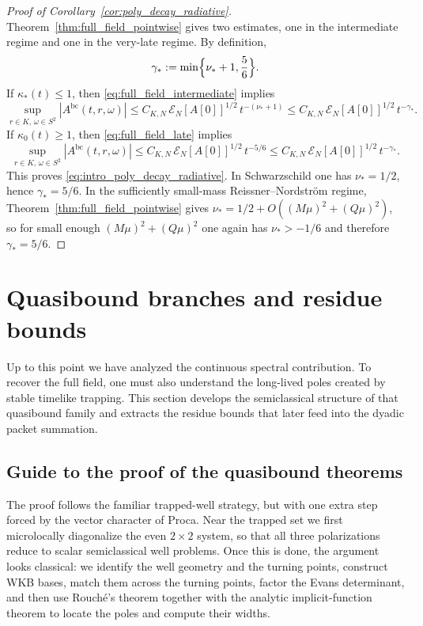 \documentclass[12pt]{article}
\numberwithin{equation}{section}
\theoremstyle{plain}
\theoremstyle{definition}
\theoremstyle{remark}
\newcommand{\bc}{\mathrm{bc}}
\newcommand{\kap}{\kappa}
\newcommand{\abs}[1]{\left|#1\right|}
\begin{document}
\begin{proof}[Proof of Corollary~\ref{cor:poly_decay_radiative}]
Theorem~\ref{thm:full_field_pointwise} gives two estimates, one in the intermediate regime and one in the very-late regime.  By definition,
\[
   \gamma_*:=\min\Bigl\{\nu_*+1,\frac56\Bigr\}.
\]
If $\kap_*(t)\le1$, then \eqref{eq:full_field_intermediate} implies
\[
   \sup_{r\in K,\,\omega\in S^2}\abs{A^{\bc}(t,r,\omega)}
   \le
   C_{K,N}\,\mathcal E_N[A[0]]^{1/2}\,t^{-(\nu_*+1)}
   \le
   C_{K,N}\,\mathcal E_N[A[0]]^{1/2}\,t^{-\gamma_*}.
\]
If $\kap_0(t)\ge1$, then \eqref{eq:full_field_late} implies
\[
   \sup_{r\in K,\,\omega\in S^2}\abs{A^{\bc}(t,r,\omega)}
   \le
   C_{K,N}\,\mathcal E_N[A[0]]^{1/2}\,t^{-5/6}
   \le
   C_{K,N}\,\mathcal E_N[A[0]]^{1/2}\,t^{-\gamma_*}.
\]
This proves \eqref{eq:intro_poly_decay_radiative}.  In Schwarzschild one has $\nu_*=1/2$, hence $\gamma_*=5/6$.  In the sufficiently small-mass Reissner--Nordstr\"om regime, Theorem~\ref{thm:full_field_pointwise} gives $\nu_*=1/2+O((M\mu)^2+(Q\mu)^2)$, so for small enough $(M\mu)^2+(Q\mu)^2$ one again has $\nu_*>-1/6$ and therefore $\gamma_*=5/6$.
\end{proof}

\section{Quasibound branches and residue bounds}\label{sec:qb}

Up to this point we have analyzed the continuous spectral contribution.  To recover the full field, one must also understand the long-lived poles created by stable timelike trapping.  This section develops the semiclassical structure of that quasibound family and extracts the residue bounds that later feed into the dyadic packet summation.

\subsection{Guide to the proof of the quasibound theorems}

The proof follows the familiar trapped-well strategy, but with one extra step forced by the vector character of Proca.  Near the trapped set we first microlocally diagonalize the even $2\times2$ system, so that all three polarizations reduce to scalar semiclassical well problems.  Once this is done, the argument looks classical: we identify the well geometry and the turning points, construct WKB bases, match them across the turning points, factor the Evans determinant, and then use Rouch\'e's theorem together with the analytic implicit-function theorem to locate the poles and compute their widths.
\end{document}
